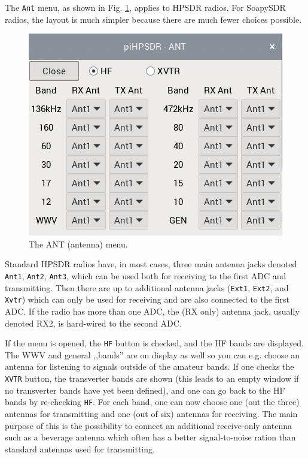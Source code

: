 \documentclass[12pt]{book}
\def\rett#1{\texttt{\color{red}#1}}
\def\bltt#1{\texttt{\color{blue}#1}}
\begin{document}
The \bltt{Ant} menu, as shown in Fig. \ref{fig:ANTmenu},
applies to HPSDR radios. For SoapySDR radios, the layout
is much simpler because there are much fewer choices possible.

\begin{figure}[ht]
\center
\includegraphics[scale=0.45]{ANTmenu.png}
\caption{The ANT (antenna) menu.}
\label{fig:ANTmenu}
\end{figure}

Standard HPSDR radios have, in most cases, three main antenna jacks
denoted \rett{Ant1}, \rett{Ant2}, \rett{Ant3}, which can be used both for receiving to
the first ADC and
transmitting. Then there are up to additional antenna jacks (\rett{Ext1}, \rett{Ext2},
and \rett{Xvtr}) which can only be used for receiving and are also connected
to the first ADC. If the radio has more than one ADC, the (RX only)
antenna jack, usually denoted RX2, is hard-wired to the second ADC.

If the menu is opened, the \rett{HF} button is checked, and the HF bands
are displayed. The WWV and general ,,bands'' are on display as well so you
can e.g. choose an antenna for listening to signals outside of
the amateur bands.
If one checks the \rett{XVTR} button, the transverter bands
are shown (this leads to an empty window if no transverter bands have
yet been defined), and one can go back to the HF bands by re-checking
\rett{HF}.
For each band, one can now choose one (out the three) antennas for
transmitting and one (out of six) antennas for receiving. The main purpose
of this is the possibility to connect an additional receive-only antenna
such as a beverage antenna which often has a better signal-to-noise
ration than standard antennas used for transmitting.
\end{document}

